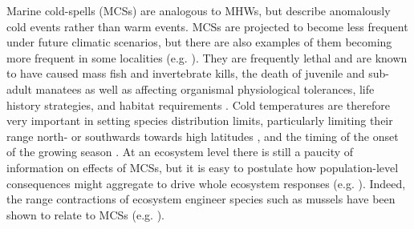\documentclass[a4paper,10pt,review]{elsarticle}
\begin{document}
Marine cold-spells (MCSs) are analogous to MHWs, but describe anomalously cold events rather than warm events. MCSs are projected to become less frequent under future climatic scenarios, but there are also examples of them becoming more frequent in some localities (e.g. \cite{Gershunov2008, Matthes2015}). They are frequently lethal \cite{Woodward1987} and are known to have caused mass fish \cite{Gunter1941, Gunter1951, Holt1983} and invertebrate \cite{Gunter1951, Crisp1964} kills, the death of juvenile and sub-adult manatees \cite{OShea1985, Marsh1986} as well as affecting organismal physiological tolerances, life history strategies, and habitat requirements \cite{Ellis2015}. Cold temperatures are therefore very important in setting species distribution limits, particularly limiting their range north- or southwards towards high latitudes \cite{Firth2011}, and the timing of the onset of the growing season \cite{Jentsch2007}. At an ecosystem level there is still a paucity of information on effects of MCSs, but it is easy to postulate how population-level consequences might aggregate to drive whole ecosystem responses (e.g. \cite{Kreyling2008, Rehage2016}). Indeed, the range contractions of ecosystem engineer species such as mussels have been shown to relate to MCSs (e.g. \cite{Firth2011, Firth2015}).
\end{document}
